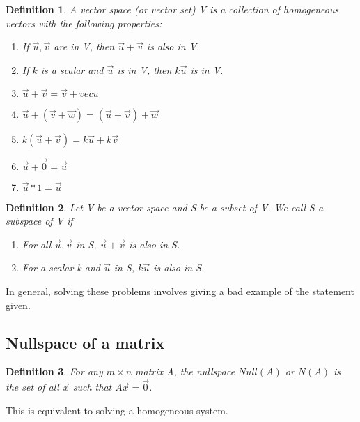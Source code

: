 \documentclass{article}
\newtheorem{definition}{Definition}
\begin{document}
\begin{definition}
	A vector space (or vector set) V is a collection of homogeneous vectors
	with the following properties: 
	\begin{enumerate}
		\item If $\vec{u},\vec{v}$ are in V, then $\vec{u}+\vec{v}$ is
			also in V.
		\item If $k$ is a scalar and $\vec{u}$ is in V, then $k\vec{u}$
			is in V.
		\item $\vec{u}+\vec{v}=\vec{v}+vec{u}$
		\item $\vec{u}+(\vec{v}+\vec{w})=(\vec{u}+\vec{v})+\vec{w}$
		\item $k(\vec{u}+\vec{v})=k\vec{u}+k\vec{v}$
		\item $\vec{u}+\vec{0}=\vec{u}$
		\item $\vec{u}*1=\vec{u}$
	\end{enumerate}
\end{definition}

\begin{definition}
	Let V be  a vector space and S be a subset of V. We call S a subspace
	of V if 
	\begin{enumerate}
		\item For all $\vec{u}, \vec{v}$ in S, $\vec{u}+\vec{v}$ is 
			also in S.
		\item For a scalar k and $\vec{u}$ in S, $k\vec{u}$ is also
			in S.
	\end{enumerate}
\end{definition}

In general, solving these problems involves giving a bad example of the 
statement given.

\subsection{Nullspace of a matrix}
\begin{definition}
	For any $m\times n$ matrix A, the nullspace $Null(A)$ or $N(A)$ is the
	set of all $\vec{x}$ such that $A\vec{x}=\vec{0}$.
\end{definition}

This is equivalent to solving a homogeneous system.
\end{document}
